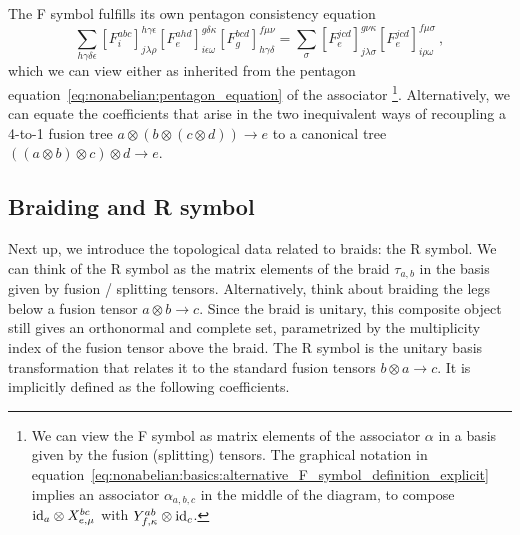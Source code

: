 The F symbol fulfills its own pentagon consistency equation
\begin{equation}
    \sum_{h\gamma\delta\epsilon}
        [ F^{abc}_i ]^{h\gamma\epsilon}_{j\lambda\rho}
        [ F^{ahd}_e ]^{g\delta\kappa}_{i\epsilon\omega}
        [ F^{bcd}_g ]^{f\mu\nu}_{h\gamma\delta}
    =
    \sum_\sigma
        [ F^{jcd}_e ]^{g\nu\kappa}_{j\lambda\sigma}
        [ F^{jcd}_e ]^{f\mu\sigma}_{i\rho\omega}
    ~,
\end{equation}
which we can view either as inherited from the pentagon equation~\eqref{eq:nonabelian:pentagon_equation} of the associator%
\footnote{
    We can view the F symbol as matrix elements of the associator $\alpha$ in a basis given by the fusion (splitting) tensors. The graphical notation in equation~\eqref{eq:nonabelian:basics:alternative_F_symbol_definition_explicit} implies an associator $\alpha_{a,b,c}$ in the middle of the diagram, to compose $\mathrm{id}_{a} \otimes X^{bc}_{e,\mu}$ with $Y^{ab}_{f,\kappa} \otimes \mathrm{id}_{c}$.
    
}.
%
Alternatively, we can equate the coefficients that arise in the two inequivalent ways of recoupling a 4-to-1 fusion tree $a \otimes ( b \otimes (c \otimes d)) \to e$ to a canonical tree $((a \otimes b) \otimes c) \otimes d \to e$.



\subsection{Braiding and R symbol}
\label{subsec:nonabelian:topo_data:R_symbol}
Next up, we introduce the topological data related to braids: the R symbol.
%
We can think of the R symbol as the matrix elements of the braid $\tau_{a,b}$ in the basis given by fusion / splitting tensors.
%
Alternatively, think about braiding the legs below a fusion tensor $a \otimes b \to c$.
%
Since the braid is unitary, this composite object still gives an orthonormal and complete set, parametrized by the multiplicity index of the fusion tensor above the braid.
%
The R symbol is the unitary basis transformation that relates it to the standard fusion tensors $b \otimes a \to c$.
%
It is implicitly defined as the following coefficients.

